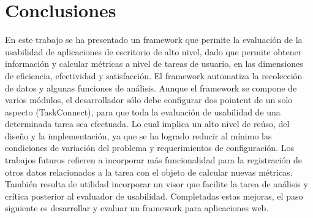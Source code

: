 \section{Conclusiones}
\label{sec:conclusiones}
En este trabajo se ha presentado un framework que permite la evaluación de la usabilidad de aplicaciones de escritorio de alto nivel, dado que permite obtener información y calcular métricas a nivel de tareas de usuario, en las dimensiones de eficiencia, efectividad y satisfacción. El framework automatiza la recolección de datos y algunas funciones de análisis. Aunque el framework se compone de varios módulos, el desarrollador sólo debe configurar dos pointcut de un solo aspecto (TaskConnect), para que toda la evaluación de usabilidad de una determinada tarea sea efectuada. Lo cual implica un alto nivel de reúso, del diseño y la implementación, ya que se ha logrado reducir al mínimo las condiciones de variación del problema y requerimientos de configuración. 
Los trabajos futuros refieren a incorporar más funcionalidad para la registración de otros datos relacionados a la tarea con el objeto de calcular nuevas métricas. También resulta de utilidad incorporar un visor que facilite la tarea de análisis y crítica posterior al evaluador de usabilidad. Completadas estas mejoras, el paso siguiente es desarrollar y evaluar un framework para aplicaciones web.
